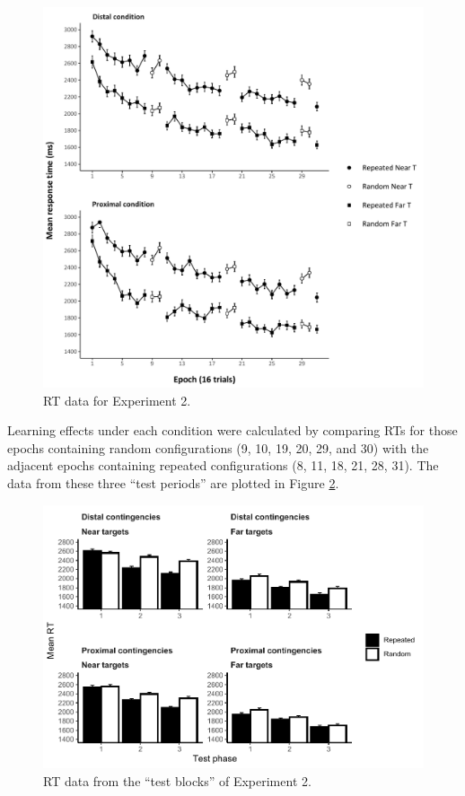 \documentclass[
  english,
  man,floatsintext]{apa7}
\begin{document}
\begin{figure}

{\centering \includegraphics{CCVR_manuscript_files/figure-latex/Exp2-RT-figure-1} 

}

\caption{RT data for Experiment 2.}\label{fig:Exp2-RT-figure}
\end{figure}

Learning effects under each condition were calculated by comparing RTs for those epochs containing random configurations (9, 10, 19, 20, 29, and 30) with the adjacent epochs containing repeated configurations (8, 11, 18, 21, 28, 31). The data from these three ``test periods'' are plotted in Figure \ref{fig:Exp2-test-figure}.



\begin{figure}

{\centering \includegraphics[width=1\linewidth]{CCVR_manuscript_files/figure-latex/Exp2-test-figure-1} 

}

\caption{RT data from the ``test blocks'' of Experiment 2.}\label{fig:Exp2-test-figure}
\end{figure}
\end{document}
